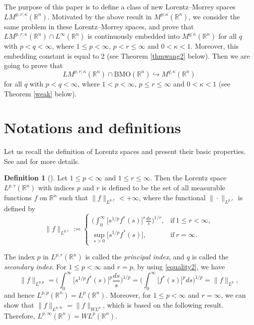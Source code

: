 \documentclass{birkjour}
\theoremstyle{definition}
\newtheorem{defn}[thm]{Definition}
\theoremstyle{remark}
\numberwithin{equation}{section}
\begin{document}
The purpose of this paper is to define a class of new Lorentz--Morrey spaces $LM^{p,r;\kappa}(\mathbb R^n)$. Motivated by the above result in $M^{p;\kappa}(\mathbb R^n)$,
we consider the same problem in these Lorentz--Morrey spaces, and prove that $LM^{p,r;\kappa}(\mathbb R^n)\cap L^\infty(\mathbb R^n)$ is continuously embedded into $M^{q;\kappa}(\mathbb R^n)$ for all $q$ with $p<q<\infty$, where $1\leq p<\infty$, $p<r\leq\infty$ and $0<\kappa<1$. Moreover, this embedding constant is equal to 2 (see Theorem \ref{thmwang2} below). Then we are going to prove that
\begin{equation*}
LM^{p,r;\kappa}(\mathbb R^n)\cap \mathrm{BMO}(\mathbb R^n)\hookrightarrow M^{q;\kappa}(\mathbb R^n)
\end{equation*}
for all $q$ with $p<q<\infty$, where $1<p<\infty$, $p\leq r\leq\infty$ and $0<\kappa<1$ (see Theorem \ref{weak} below).

\section{Notations and definitions}

Let us recall the definition of Lorentz spaces and present their basic properties. See \cite[Chapter 1]{Grafakos2} and \cite[Chapter 5]{sw} for more details.
\begin{defn}[\cite{Grafakos2,sw}]
Let $1\leq p<\infty$ and $1\leq r\leq\infty$. Then the Lorentz space $L^{p,r}(\mathbb R^n)$ with indices $p$ and $r$ is defined to be the set of all measurable functions $f$ on $\mathbb R^n$ such that $\|f\|_{L^{p,r}}<+\infty$, where the functional $\|\cdot\|_{L^{p,r}}$ is defined by
\begin{equation*}
\|f\|_{L^{p,r}}:=
\begin{cases}
\displaystyle\bigg(\int_0^{\infty}\Big[s^{1/p}f^{*}(s)\Big]^r\frac{ds}{s}\bigg)^{1/r}, &\mbox{if}~ 1\leq r<\infty,\\
\displaystyle\sup_{s>0}\Big[s^{1/p}f^{*}(s)\Big], &\mbox{if}~ r=\infty.
\end{cases}
\end{equation*}
\end{defn}
The index $p$ in $L^{p,r}(\mathbb R^n)$ is called the \emph{principal index}, and $q$ is called the \emph{secondary index}. For $1\leq p<\infty$ and $r=p$, by using \eqref{equality2}, we have
\begin{equation}\label{lorentz1}
\|f\|_{L^{p,p}}=\bigg(\int_0^{\infty}\Big[s^{1/p}f^{*}(s)\Big]^p\frac{ds}{s}\bigg)^{1/p}
=\bigg(\int_{0}^{\infty}\big[f^{*}(s)\big]^pds\bigg)^{1/p}=\|f\|_{L^p},
\end{equation}
and hence $L^{p,p}(\mathbb R^n)=L^{p}(\mathbb R^n)$. Moreover, for $1\leq p<\infty$ and $r=\infty$, we can show that $\|f\|_{L^{p,\infty}}=\|f\|_{WL^{p}}$, which is based on the following result. Therefore, $L^{p,\infty}(\mathbb R^n)=WL^{p}(\mathbb R^n)$.
\end{document}
